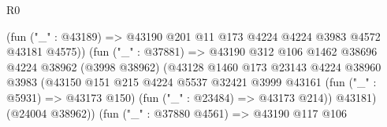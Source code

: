 \begin{lexlean}{R0}
\begin{coremodule}
                                                  (fun ("_" : @43189) =>
                                                  @43190
                                                    @201
                                                    @11
                                                    @173
                                                    @4224
                                                    @4224
                                                    @3983
                                                    @4572
                                                    @43181
                                                    @4575))
                                                (fun ("_" : @37881) =>
                                                @43190
                                                  @312
                                                  @106
                                                  @1462
                                                  @38696
                                                  @4224
                                                  @38962
                                                  (@3998 @38962)
                                                  (@43128
                                                    @1460
                                                    @173
                                                    @23143
                                                    @4224
                                                    @38960
                                                    @3983
                                                    (@43150
                                                      @151
                                                      @215
                                                      @4224
                                                      @5537
                                                      @32421
                                                      @3999
                                                      @43161
                                                      (fun ("_" : @5931) => @43173 @150)
                                                      (fun ("_" : @23484) => @43173 @214))
                                                    @43181)
                                                  (@24004 @38962))
                                                (fun ("_" : @37880 @4561) =>
                                                @43190
                                                  @117
                                                  @106

\end{coremodule}
\end{lexlean}
